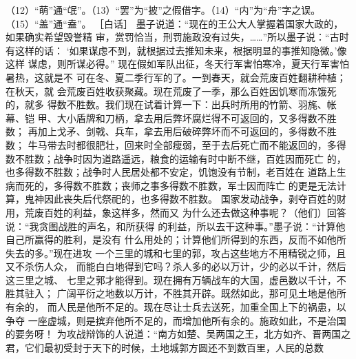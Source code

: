 \documentclass[12pt,UTF8]{ctexbook}
\begin{document}
（12）“萌”通“氓”。（13）“罢”为“披”之假借字。（14）“内”为“舟”字之误。（15）“盖”通“盍”。 
［白话］ 
墨子说道：“现在的王公大人掌握着国家大政的，如果确实希望毁誉精 
审，赏罚恰当，刑罚施政没有过失，……”所以墨子说：“古时有这样的话： 
‘如果谋虑不到，就根据过去推知未来，根据明显的事推知隐微。’像这样 
谋虑，则所谋必得。” 
现在假如军队出征，冬天行军害怕寒冷，夏天行军害怕暑热，这就是不 
可在冬、夏二季行军的了。一到春天，就会荒废百姓翻耕种植；在秋天，就 
会荒废百姓收获聚藏。现在荒废了一季，那么百姓因饥寒而冻饿死的，就多 
得数不胜数。我们现在试着计算一下：出兵时所用的竹箭、羽旄、帐幕、铠 
甲、大小盾牌和刀柄，拿去用后弊坏腐烂得不可返回的，又多得数不胜数； 
再加上戈矛、剑戟、兵车，拿去用后破碎弊坏而不可返回的，多得数不胜数； 
牛马带去时都很肥壮，回来时全部瘦弱，至于去后死亡而不能返回的，多得 
数不胜数；战争时因为道路遥远，粮食的运输有时中断不继，百姓因而死亡 
的，也多得数不胜数；战争时人民居处都不安定，饥饱没有节制，老百姓在 
道路上生病而死的，多得数不胜数；丧师之事多得数不胜数，军士因而阵亡 
的更是无法计算，鬼神因此丧失后代祭祀的，也多得数不胜数。 
国家发动战争，剥夺百姓的财用，荒废百姓的利益，象这样多，然而又 
为什么还去做这种事呢？（他们）回答说：“我贪图战胜的声名，和所获得 
的利益，所以去干这种事。”墨子说：“计算他自己所赢得的胜利，是没有 
什么用处的；计算他们所得到的东西，反而不如他所失去的多。”现在进攻 
一个三里的城和七里的郭，攻占这些地方不用精锐之师，且又不杀伤人众， 
而能白白地得到它吗？杀人多的必以万计，少的必以千计，然后这三里之城、 
七里之郭才能得到。现在拥有万辆战车的大国，虚邑数以千计，不胜其驻入； 
广阔平衍之地数以万计，不胜其开辟。既然如此，那可见土地是他所有余的， 
而人民是他所不足的。现在尽让士兵去送死，加重全国上下的祸患，以争夺 
一座虚城，则是摈弃他所不足的，而增加他所有余的。施政如此，不是治国 
的要务呀！ 
为攻战辩饰的人说道：“南方如楚、吴两国之王，北方如齐、晋两国之 
君，它们最初受封于天下的时候，土地城郭方圆还不到数百里，人民的总数 
\end{document}

